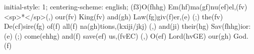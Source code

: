initial-style: 1;
centering-scheme: english;
(f3)O(fhhg) Em(hf)ma(gf)nu(ef)el,(fv) <sp>*</sp>(,) our(fv) King(fv) and(gh) Law(fg)giv(f)er,(e) (;) the(fv) De(cf)sire(fg) of(f) all(f) na(gh)tions,(kxiji/jkj) (,) and(ji) their(hg) Sav(fhhg)ior:(e) (;) come(ehhg) and(f) save(ef) us,(fvEC) (,) O(ef) Lord(hvGE) our(gh) God.(f)
